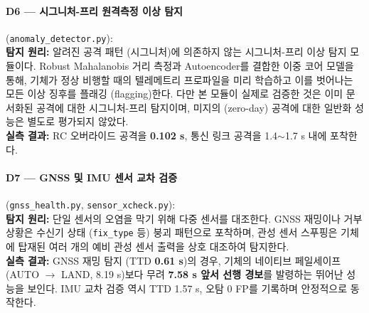\paragraph{\textbf{D6 --- 시그니처-프리 원격측정 이상 탐지}} (\texttt{anomaly\_detector.py}): ~\\
\textbf{탐지 원리:} 알려진 공격 패턴 (시그니처)에 의존하지 않는 시그니처-프리 이상 탐지 모듈이다. Robust Mahalanobis 거리 측정과 Autoencoder를 결합한 이중 코어 모델을 통해, 기체가 정상 비행할 때의 텔레메트리 프로파일을 미리 학습하고 이를 벗어나는 모든 이상 징후를 플래깅 (flagging)한다. 다만 본 모듈이 실제로 검증한 것은 이미 문서화된 공격에 대한 시그니처-프리 탐지이며, 미지의 (zero-day) 공격에 대한 일반화 성능은 별도로 평가되지 않았다.\\
\textbf{실측 결과:} RC 오버라이드 공격을 \textbf{0.102 s}, 통신 링크 공격을 1.4$\sim$1.7 s 내에 포착한다. 

\paragraph{\textbf{D7 --- GNSS 및 IMU 센서 교차 검증}} (\texttt{gnss\_health.py}, \texttt{sensor\_xcheck.py}): ~\\
\textbf{탐지 원리:} 단일 센서의 오염을 막기 위해 다중 센서를 대조한다. GNSS 재밍이나 거부 상황은 수신기 상태 (\texttt{fix\_type} 등) 붕괴 패턴으로 포착하며, 관성 센서 스푸핑은 기체에 탑재된 여러 개의 예비 관성 센서 출력을 상호 대조하여 탐지한다.\\
\textbf{실측 결과:} GNSS 재밍 탐지 (TTD \textbf{0.61 s})의 경우, 기체의 네이티브 페일세이프 (AUTO $\to$ LAND, 8.19 s)보다 무려 \textbf{7.58 s 앞서 선행 경보}를 발령하는 뛰어난 성능을 보인다. IMU 교차 검증 역시 TTD 1.57 s, 오탐 0 FP를 기록하며 안정적으로 동작한다.

